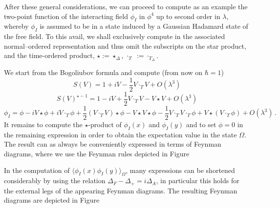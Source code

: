 \documentclass[10pt]{book}
\theoremstyle{break}
\begin{document}
After these general considerations, we can proceed to compute as an example the two-point function of the interacting field $\phi_I$ in $\phi^4$ up to second order in $\lambda$, whereby $\phi_I$ is assumed to be in a state induced by a Gaussian Hadamard state of the free field. To this avail, we shall exclusively compute in the associated normal--ordered representation and thus omit the subscripts on the star product, and the time-ordered product, $\star:=\star_\Delta$, $\cdot_T\;:=\cdot_{T_\Delta}$.


We start from the Bogoliubov formula %
and compute (from now on $\hbar=1$)
$$
S(V)=1+iV-\frac12 V\cdot_T V + O(\lambda^3)
$$
$$
S(V)^{\star -1}=1-iV+\frac12 V\cdot_T V-V\star V + O(\lambda^3)
$$
$$
\phi_I=\phi-i V\star \phi+i V\cdot_T\phi+\frac12\left( V\cdot_T V\right)\star \phi-V\star V\star\phi-\frac12 V\cdot_T V\cdot_T \phi+V\star(V\cdot_T\phi)+O(\lambda^3)\,.
$$
It remains to compute the $\star$-product of $\phi_I(x)$ and $\phi_I(y)$ and to set $\phi=0$ in the remaining expression in order to obtain the expectation value in the state $\Omega$. The result can as always be conveniently expressed in terms of Feynman diagrams, where we use the Feynman rules depicted in Figure %


 In the computation of $\langle\phi_I(x)\phi_I(y)\rangle_\Omega$, many expressions can be shortened considerably by using the relation $\Delta_F-\Delta_+=i\Delta_A$, in particular this holds for the external legs of the appearing Feynman diagrams. The resulting Feynman diagrams are depicted in Figure %


\end{document}
